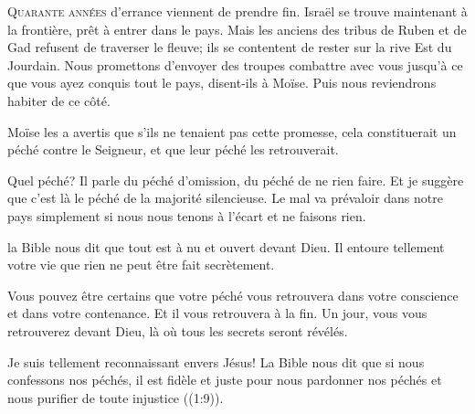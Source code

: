 \dvrule







\lettrine{Q}{uarante années} d'errance viennent de prendre fin.
 Israël se trouve maintenant à la frontière, prêt à entrer dans le pays.
 Mais les anciens des tribus de Ruben et de Gad
 refusent de traverser le fleuve;
 ils se contentent de rester sur la rive Est du Jourdain.
 \Og Nous promettons d'envoyer des troupes combattre avec vous
 jusqu'à ce que vous ayez conquis tout le pays,
 disent-ils à Moïse. Puis nous reviendrons habiter de ce côté. \Fg{}

Moïse les a avertis que s'ils ne tenaient pas cette promesse,
 cela constituerait un péché contre le Seigneur,
 et que leur péché les retrouverait.

Quel péché? Il parle du péché d'omission, du péché de ne rien faire.
 Et je suggère que c'est là le péché de la majorité silencieuse.
 Le mal va prévaloir dans notre pays simplement
 si nous nous tenons à l'écart et ne faisons rien.


la Bible nous dit que tout est à nu et ouvert devant Dieu.
 Il entoure tellement votre vie que rien ne peut être fait secrètement.

Vous pouvez être certains que votre péché vous retrouvera
 dans votre conscience et dans votre contenance.
 Et il vous retrouvera à la fin.
 Un jour, vous vous retrouverez devant Dieu,
 là où tous les secrets seront révélés.

Je suis tellement reconnaissant envers Jésus! La Bible nous dit que
 \Og si nous confessons nos péchés, il est fidèle et juste
 pour nous pardonner nos péchés et nous purifier
 de toute injustice \Fg{} ((1:9)). 

